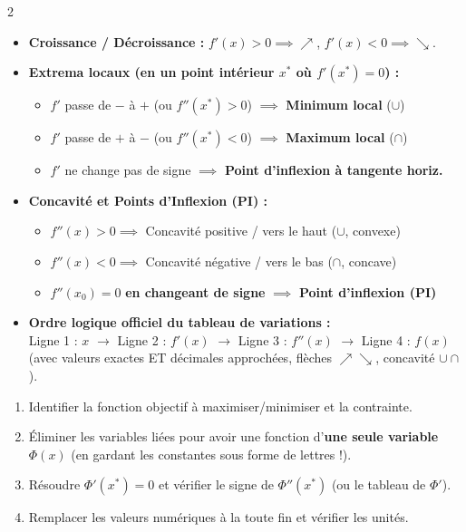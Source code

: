 {\begin{multicols}{2}
\vspace{2pt}
\begin{itemize}[leftmargin=1.2em, itemsep=1.2pt, topsep=1.5pt]
    \item \textbf{Croissance / Décroissance :} $f'(x) > 0 \implies \nearrow$, \quad $f'(x) < 0 \implies \searrow$.
    \item \textbf{Extrema locaux (en un point intérieur $x^*$ où $f'(x^*) = 0$) :}
    \begin{itemize}[leftmargin=1em, itemsep=0.5pt, topsep=0.5pt]
        \item $f'$ passe de $-$ à $+$ (ou $f''(x^*) > 0$) $\implies$ \textbf{Minimum local} ($\cup$)
        \item $f'$ passe de $+$ à $-$ (ou $f''(x^*) < 0$) $\implies$ \textbf{Maximum local} ($\cap$)
        \item $f'$ ne change pas de signe $\implies$ \textbf{Point d'inflexion à tangente horiz.}
    \end{itemize}
    \item \textbf{Concavité et Points d'Inflexion (PI) :}
    \begin{itemize}[leftmargin=1em, itemsep=0.5pt, topsep=0.5pt]
        \item $f''(x) > 0 \implies$ Concavité positive / vers le haut ($\cup$, convexe)
        \item $f''(x) < 0 \implies$ Concavité négative / vers le bas ($\cap$, concave)
        \item $f''(x_0) = 0$ \textbf{en changeant de signe} $\implies$ \textbf{Point d'inflexion (PI)}
    \end{itemize}
    \item \textbf{Ordre logique officiel du tableau de variations :}\\
    Ligne 1 : $x$ $\to$ Ligne 2 : $f'(x)$ $\to$ Ligne 3 : $f''(x)$ $\to$ Ligne 4 : $f(x)$ (avec valeurs exactes ET décimales approchées, flèches $\nearrow\searrow$, concavité $\cup\cap$).
\end{itemize}

\vspace{2pt}
\begin{enumerate}[leftmargin=1.5em, itemsep=0.5pt, topsep=0.5pt]
    \item Identifier la fonction objectif à maximiser/minimiser et la contrainte.
    \item Éliminer les variables liées pour avoir une fonction d'\textbf{une seule variable} $\Phi(x)$ (en gardant les constantes sous forme de lettres !).
    \item Résoudre $\Phi'(x^*) = 0$ et vérifier le signe de $\Phi''(x^*)$ (ou le tableau de $\Phi'$).
    \item Remplacer les valeurs numériques à la toute fin et vérifier les unités.
\end{enumerate}

\end{multicols}
}

